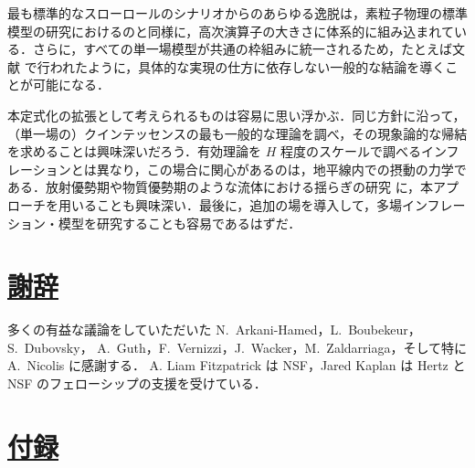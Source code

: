 最も標準的なスローロールのシナリオからのあらゆる逸脱は，素粒子物理の標準模型の研究におけるのと同様に，高次演算子の大きさに体系的に組み込まれている．さらに，すべての単一場模型が共通の枠組みに統一されるため，たとえば文献 \cite{Cheung:2007sv,Arkani-Hamed:2007ryv} で行われたように，具体的な実現の仕方に依存しない一般的な結論を導くことが可能になる．

本定式化の拡張として考えられるものは容易に思い浮かぶ．同じ方針に沿って，（単一場の）クインテッセンスの最も一般的な理論を調べ，その現象論的な帰結を求めることは興味深いだろう．有効理論を $H$ 程度のスケールで調べるインフレーションとは異なり，この場合に関心があるのは，地平線内での摂動の力学である．放射優勢期や物質優勢期のような流体における揺らぎの研究 \cite{Dubovsky:2005xd} に，本アプローチを用いることも興味深い．最後に，追加の場を導入して，多場インフレーション・模型を研究することも容易であるはずだ．

\section*{\hyperlink{toc}{謝辞}}
多くの有益な議論をしていただいた N.~Arkani-Hamed，L.~Boubekeur，S.~Dubovsky，
A.~Guth，F.~Vernizzi，J.~Wacker，M.~Zaldarriaga，そして特に A.~Nicolis に感謝する．
A. Liam Fitzpatrick は NSF，Jared Kaplan は Hertz と NSF のフェローシップの支援を受けている．

\appendix

\section*{\hyperlink{toc}{付録}}

